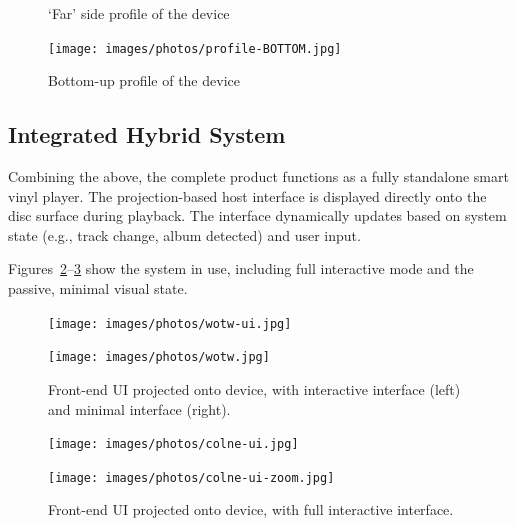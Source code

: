 \begin{figure}[H]
\begin{minipage}[b]{0.225\textwidth}
                    \caption{`Far' side profile of the device}
                    \label{fig:side2}
                \end{minipage}
                \hfill
                \begin{minipage}[b]{0.45\textwidth}
                    \centering
                    \texttt{[image: images/photos/profile-BOTTOM.jpg]}
                    \caption{Bottom-up profile of the device}
                    \label{fig:bottom}
                \end{minipage}
            \end{figure}
    
        \subsection{Integrated Hybrid System}
    
            Combining the above, the complete product functions as a fully standalone smart vinyl player. The projection-based host interface is displayed directly onto the disc surface during playback. The interface dynamically updates based on system state (e.g., track change, album detected) and user input.
    
            Figures~\ref{fig:wotw}–\ref{fig:colne} show the system in use, including full interactive mode and the passive, minimal visual state.
    
            \begin{figure}[h]
                \centering
                \begin{minipage}[b]{0.45\textwidth}
                    \centering
                    \texttt{[image: images/photos/wotw-ui.jpg]}
                \end{minipage}
                \hfill
                \begin{minipage}[b]{0.45\textwidth}
                    \centering
                    \texttt{[image: images/photos/wotw.jpg]}
                \end{minipage}
                \label{fig:wotw}
                \caption{Front-end UI projected onto device, with interactive interface (left) and minimal interface (right).}
            \end{figure}
            
            \begin{figure}[h]
                \centering
                \begin{minipage}[b]{0.45\textwidth}
                    \centering
                    \texttt{[image: images/photos/colne-ui.jpg]}
                \end{minipage}
                \hfill
                \begin{minipage}[b]{0.45\textwidth}
                    \centering
                    \texttt{[image: images/photos/colne-ui-zoom.jpg]}
                \end{minipage}
                \label{fig:colne}
                \caption{Front-end UI projected onto device, with full interactive interface.}
            \end{figure}
    
